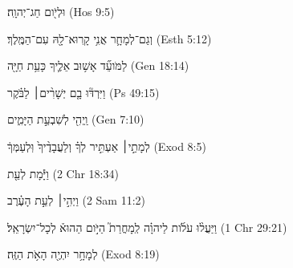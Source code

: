 
\begin{exe}

\ex\label{Lsim_exs1}
\texthebrew{
וּלְיֹ֖ום חַג־יְהוָֽה׃ 
} (Hos 9:5)

\ex\label{Lsim_exs2}
\texthebrew{
וְגַם־לְמָחָ֛ר אֲנִ֥י קָֽרוּא־לָ֖הּ עִם־הַמֶּֽלֶךְ׃ 
} (Esth 5:12)

\ex\label{Lsim_exs3}
\texthebrew{
לַמֹּועֵ֞ד אָשׁ֥וּב אֵלֶ֛יךָ כָּעֵ֥ת חַיָּ֖ה 
} (Gen 18:14)

\ex\label{Lsim_exs4}
\texthebrew{
וַיִּרְדּ֘וּ בָ֤ם יְשָׁרִ֨ים׀ לַבֹּ֗קֶר 
} (Ps 49:15)

\ex\label{Lsim_exs5}
\texthebrew{
וַֽיְהִ֖י לְשִׁבְעַ֣ת הַיָּמִ֑ים 
} (Gen 7:10)

\ex\label{Lsim_exs6}
\texthebrew{
לְמָתַ֣י׀ אַעְתִּ֣יר לְךָ֗ וְלַעֲבָדֶ֨יךָ֙ וּֽלְעַמְּךָ֔ 
} (Exod 8:5)

\ex\label{Lsim_exs7}
\texthebrew{
וַיָּ֕מָת לְעֵ֖ת 
} (2 Chr 18:34)

\ex\label{Lsim_exs8}
\texthebrew{
וַיְהִ֣י׀ לְעֵ֣ת הָעֶ֗רֶב 
} (2 Sam 11:2)

\ex\label{Lsim_exs9}
\texthebrew{
וַיַּעֲל֨וּ עֹלֹ֜ות לַיהוָ֗ה לְֽמָחֳרַת֮ הַיֹּ֣ום הַהוּא֒ לְכָל־יִשְׂרָאֵֽל׃ 
} (1 Chr 29:21)

\ex\label{Lsim_exs10}
\texthebrew{
לְמָחָ֥ר יִהְיֶ֖ה הָאֹ֥ת הַזֶּֽה׃ 
} (Exod 8:19)

\end{exe}
